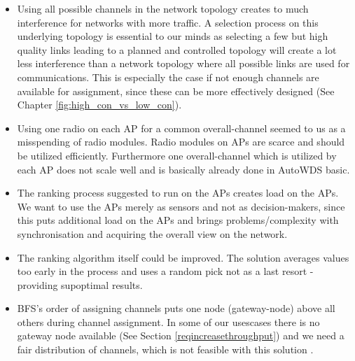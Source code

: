     \begin{itemize}
      \item Using all possible channels in the network topology creates to much interference for networks with more traffic.
	A selection process on this underlying topology is essential to our minds as selecting a few but high quality links
	leading to a planned and controlled topology will create a lot less interference than a network topology where all possible 
	links are used for communications. This is especially the case if not enough channels are available for assignment, since 
	these can be more effectively designed (See Chapter \ref{fig:high_con_vs_low_con}).
	\label{topologypreservingdealbreaker}
	
      \item Using one radio on each \ac{AP} for a common overall-channel seemed to us as a misspending of radio modules.
	Radio modules on APs are scarce and should be utilized efficiently. 
	Furthermore one overall-channel which is utilized by each \ac{AP} does not scale well and is basically already done in AutoWDS basic.
	
      \item The ranking process suggested to run on the APs creates load on the APs.
	We want to use the APs merely as sensors and not as decision-makers, 
	since this puts additional load on the APs and brings problems/complexity with synchronisation and
	acquiring the overall view on the network.
	
      \item The ranking algorithm itself could be improved. 
	The solution averages values too early in the process and uses a random pick not as a last resort - providing supoptimal results.
	
      \item \ac{BFS}'s order of assigning channels puts one node (gateway-node) above all others during channel assignment.
	In some of our usescases there is no gateway node available (See Section \ref{reqincreasethroughput}) and we need a fair distribution of channels, 
	which is not feasible with this solution \cite{overview_caa}.
    \end{itemize}


